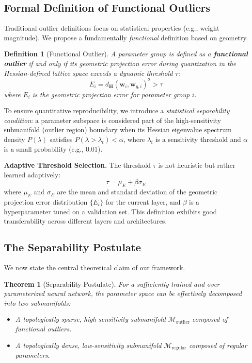 \documentclass[letterpaper,twocolumn,10pt]{article}
\newtheorem{theorem}{Theorem}
\newtheorem{definition}{Definition}
\begin{document}
\subsection{Formal Definition of Functional Outliers}

Traditional outlier definitions focus on statistical properties (e.g., weight magnitude). We propose a fundamentally \emph{functional} definition based on geometry.

\begin{definition}[Functional Outlier]
A parameter group is defined as a \textbf{functional outlier} if and only if its geometric projection error during quantization in the Hessian-defined lattice space exceeds a dynamic threshold $\tau$:
\begin{equation}
E_i = d_{\mathbf{H}}(\mathbf{w}_i, \mathbf{w}_{q,i})^2 > \tau
\end{equation}
where $E_i$ is the geometric projection error for parameter group $i$.
\end{definition}

To ensure quantitative reproducibility, we introduce a \emph{statistical separability condition}: a parameter subspace is considered part of the high-sensitivity submanifold (outlier region) boundary when its Hessian eigenvalue spectrum density $P(\lambda)$ satisfies $P(\lambda > \lambda_t) < \alpha$, where $\lambda_t$ is a sensitivity threshold and $\alpha$ is a small probability (e.g., 0.01).

\textbf{Adaptive Threshold Selection.} The threshold $\tau$ is not heuristic but rather learned adaptively:
\begin{equation}
\tau = \mu_E + \beta \sigma_E
\label{eq:threshold}
\end{equation}
where $\mu_E$ and $\sigma_E$ are the mean and standard deviation of the geometric projection error distribution $\{E_i\}$ for the current layer, and $\beta$ is a hyperparameter tuned on a validation set. This definition exhibits good transferability across different layers and architectures.

\subsection{The Separability Postulate}

We now state the central theoretical claim of our framework.

\begin{theorem}[Separability Postulate]
For a sufficiently trained and over-parameterized neural network, the parameter space can be effectively decomposed into two submanifolds:
\begin{itemize}
\item A topologically sparse, high-sensitivity submanifold $\mathcal{M}_{\text{outlier}}$ composed of functional outliers.
\item A topologically dense, low-sensitivity submanifold $\mathcal{M}_{\text{regular}}$ composed of regular parameters.
\end{itemize}
\end{theorem}
\end{document}
